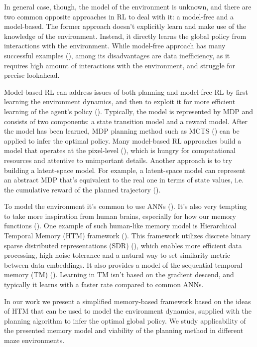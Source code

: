 \documentclass[runningheads]{llncs}
\begin{document}
In general case, though, the model of the environment is unknown, and there are two common opposite approaches in RL to deal with it: a model-free and a model-based. The former approach doesn't explicitly learn and make use of the knowledge of the environment. Instead, it directly learns the global policy from interactions with the environment. While model-free approach has many successful examples (\cite{Mnih_2015_Atari,haarnoja_2018_sac,schulman_2017_ppo}), among its disadvantages are data inefficiency, as it requires high amount of interactions with the environment, and struggle for precise lookahead.

Model-based RL can address issues of both planning and model-free RL by first learning the environment dynamics, and then to exploit it for more efficient learning of the agent's policy (\cite{moerland_2020_modelbased}). Typically, the model is represented by MDP and consists of two components: a state transition model and a reward model. After the model has been learned, MDP planning method such as MCTS (\cite{Coulom_2007_mcts}) can be applied to infer the optimal policy. Many model-based RL approaches build a model that operates at the pixel-level (\cite{kaiser_2020_modelbased}), which is hungry for computational resources and attentive to unimportant details. Another approach is to try building a latent-space model. For example, a latent-space model can represent an abstract MDP that's equivalent to the real one in terms of state values, i.e. the cumulative reward of the planned trajectory (\cite{silver_2020_muzero}).

To model the environment it's common to use ANNs (\cite{silver_2020_muzero,Ha_Schmidhuber_2018_worldmodels}). It's also very tempting to take more inspiration from human brains, especially for how our memory functions (\cite{Hassabis_2017_neuro}). One example of such human-like memory model is Hierarchical Temporal Memory (HTM) framework (\cite{George_Hawkins_2009}). This framework utilizes discrete binary sparse distributed representations (SDR) (\cite{Cui_Ahmad_Hawkins_2017_sdr}), which enables more efficient data processing, high noise tolerance and a natural way to set similarity metric between data embeddings. It also provides a model of the sequential temporal memory (TM) (\cite{hawkins_TM}). Learning in TM isn't based on the gradient descend, and typically it learns with a faster rate compared to common ANNs.

In our work we present a simplified memory-based framework based on the ideas of HTM that can be used to model the environment dynamics, supplied with the planning algorithm to infer the optimal global policy. We study applicability of the presented memory model and viability of the planning method in different maze environments.
\end{document}
